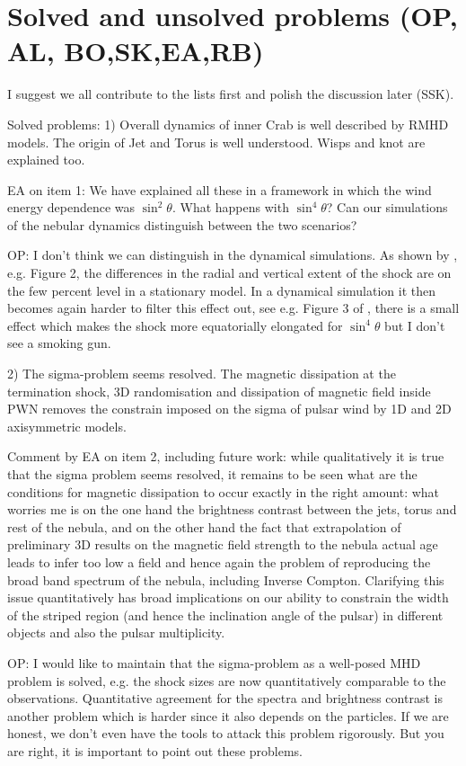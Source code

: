 \section{Solved and unsolved problems      (OP, AL, BO,SK,EA,RB)}
\label{sec:discussion}

I suggest we all contribute to the lists first and polish the discussion later (SSK). 

Solved problems: 
1) Overall dynamics of inner Crab is well described by RMHD models. The origin of Jet and Torus is well understood. Wisps and knot are explained too.

EA on item 1: We have explained all these in a framework in which the wind energy dependence was $\sin^2\theta$. What happens with $\sin^4\theta$? Can our simulations of the nebular dynamics distinguish between the two scenarios?

OP: I don't think we can distinguish in the dynamical simulations.  As shown by \cite{LyutikovKomissarov2016}, e.g. Figure 2, the differences in the radial and vertical extent of the shock are on the few percent level in a stationary model.  In a dynamical simulation it then becomes again harder to filter this effect out, see e.g. Figure 3 of \cite{BuhlerGiomi2016}, there is a small effect which makes the shock more equatorially elongated for $\sin^4\theta$ but I don't see a smoking gun.  

2) The sigma-problem seems resolved. The magnetic dissipation at the termination shock, 3D randomisation and dissipation of magnetic field inside PWN removes the constrain imposed on the sigma of pulsar wind by 1D and 2D axisymmetric models.

Comment by EA on item 2, including future work: while qualitatively it is true that the sigma problem seems resolved, it remains to be seen what are the conditions for magnetic dissipation to occur exactly in the right amount: what worries me is on the one hand the brightness contrast between the jets, torus and rest of the nebula, and on the other hand the fact that extrapolation of preliminary 3D results on the magnetic field strength to the nebula actual age leads to infer too low a field and hence again the problem of reproducing the broad band spectrum of the nebula, including Inverse Compton.
Clarifying this issue quantitatively has broad implications on our ability to constrain the width of the striped region (and hence the inclination angle of the pulsar) in different objects and also the pulsar multiplicity. 

OP: I would like to maintain that the sigma-problem as a well-posed MHD problem is solved, e.g. the shock sizes are now quantitatively comparable to the observations.  Quantitative agreement for the spectra and brightness contrast is another problem which is harder since it also depends on the particles.  If we are honest, we don't even have the tools to attack this problem rigorously.  But you are right, it is important to point out these problems.  


